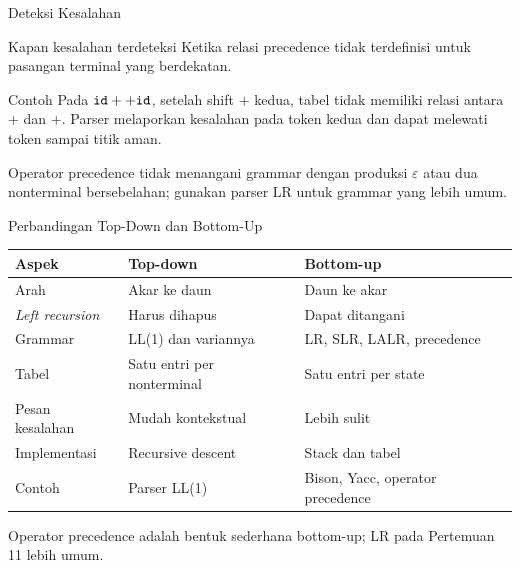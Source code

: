 \documentclass[aspectratio=169,10pt,t]{beamer}
\begin{document}
\begin{frame}{Deteksi Kesalahan}
  \begin{block}{Kapan kesalahan terdeteksi}
    \small
    Ketika relasi precedence tidak terdefinisi untuk pasangan terminal
    yang berdekatan.
  \end{block}

  \begin{exampleblock}{Contoh}
    \footnotesize
    Pada \(\texttt{id}++\texttt{id}\), setelah shift \(+\) kedua, tabel
    tidak memiliki relasi antara \(+\) dan \(+\). Parser melaporkan
    kesalahan pada token kedua dan dapat melewati token sampai titik
    aman.
  \end{exampleblock}

  \vspace{2pt}
  {\footnotesize\color{ubbblue!80}Operator precedence tidak menangani
  grammar dengan produksi \(\varepsilon\) atau dua nonterminal
  bersebelahan; gunakan parser LR untuk grammar yang lebih umum.}
\end{frame}

\begin{frame}{Perbandingan Top-Down dan Bottom-Up}
  \scriptsize
  \setlength{\tabcolsep}{4pt}
  \begin{tabular}{@{}p{2.6cm}p{5.2cm}p{5.8cm}@{}}
    \toprule
    \textbf{Aspek} & \textbf{Top-down} & \textbf{Bottom-up} \\
    \midrule
    Arah & Akar ke daun & Daun ke akar \\
    \textit{Left recursion} & Harus dihapus & Dapat ditangani \\
    Grammar & LL(1) dan variannya & LR, SLR, LALR, precedence \\
    Tabel & Satu entri per nonterminal & Satu entri per state \\
    Pesan kesalahan & Mudah kontekstual & Lebih sulit \\
    Implementasi & Recursive descent & Stack dan tabel \\
    Contoh & Parser LL(1) & Bison, Yacc, operator precedence \\
    \bottomrule
  \end{tabular}

  \vspace{4pt}
  {\scriptsize\color{ubbblue!75}Operator precedence adalah bentuk
  sederhana bottom-up; LR pada Pertemuan 11 lebih umum.}
\end{frame}
\end{document}

